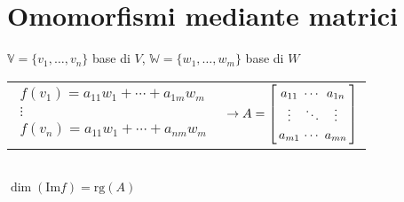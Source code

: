 \section{Omomorfismi mediante matrici}
$\mathbb{V} = \{v_1, \ldots, v_n\}$ base di $V$, $\mathbb{W} = \{w_1, \ldots, w_m\}$ base di $W$ \\
\begin{tabular}{@{}l@{}l@{}}
	$\begin{matrix}
		f(v_1) = a_{11}w_1 + \cdots + a_{1m}w_m \\
		\vdots \\
		f(v_n) = a_{11}w_1 + \cdots + a_{nm}w_m \\
	\end{matrix}$ &
	$\rightarrow A = \left[
        \arraycolsep=1.7pt\def\arraystretch{1.2}
        \begin{array}{ccc}
            a_{11} & \cdots & a_{1n} \\
            \vdots & \ddots & \vdots \\
            a_{m1} & \cdots & a_{mn} \\
        \end{array}
    \right]$
\end{tabular} \\
$\dim(\text{Im}f) = \text{rg}(A)$ \\